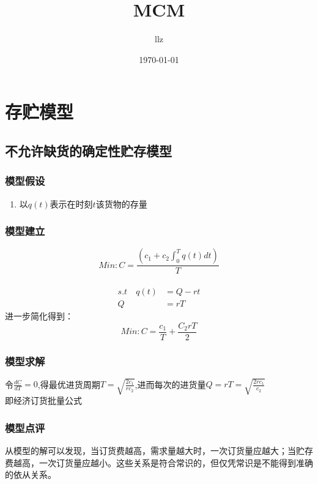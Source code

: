 \documentclass[12pt,a4paper]{article}
\title{MCM}
\author{llz}
\date{\today}
\begin{document}
\kaishu
\maketitle

\section{存贮模型}
\subsection{不允许缺货的确定性贮存模型}
\subsubsection{模型假设}
\begin{enumerate}
，单位时间（每天）对物品的需求量恒为$r$吨；即经营商品单一，顾客对该物品需求量在时间上保持恒定；
$T$天进货$Q$吨；且假设每次进货是在存货全部售出后即刻进行，不允许缺货，即$Q=rT$;
$c_1$，在正常期间，还需支付货物的贮存费用，单位时间（天）单位（吨）货物需支付货物的贮存费用$c_2$;
\item 以$q(t)$表示在时刻$t$该货物的存量
\end{enumerate}
\subsubsection{模型建立}
 $$Min:C=\frac{(c_1+c_2\int_{0}^{T}q(t)dt)}{T}$$\\
\begin{displaymath}
\begin{split}
 s.t \quad q(t)&=Q-rt\\
 Q&=rT
\end{split}
\end{displaymath}
进一步简化得到：\\
$$Min: C=\frac{c_1}{T}+\frac{C_2 rT}{2}$$
\subsubsection{模型求解}
令$\frac{dC}{dT}=0$,得最优进货周期$T=\sqrt{\frac{2c_1}{rc_2}}$,进而每次的进货量$Q=rT=\sqrt{\frac{2rc_1}{c_2}}$\\
即经济订货批量公式

\subsubsection{模型点评}
从模型的解可以发现，当订货费越高，需求量越大时，一次订货量应越大；当贮存费越高，一次订货量应越小。这些关系是符合常识的，但仅凭常识是不能得到准确的依从关系。
\end{document}
